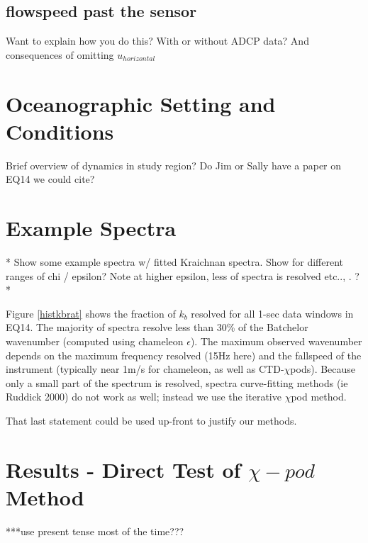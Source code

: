 \documentclass{ametsoc}
\begin{document}
\subsection{flowspeed past the sensor}

Want to explain how you do this?  With or without ADCP data?  And consequences of omitting $u_{horizontal}$


\section{Oceanographic Setting and Conditions}

Brief overview of dynamics in study region? Do Jim or Sally have a paper on EQ14 we could cite?


\section{Example Spectra}

* Show some example spectra w/ fitted Kraichnan spectra. Show for different ranges of chi / epsilon? Note at higher epsilon, less of spectra is resolved etc.., . ?*

Figure \ref{histkbrat} shows the fraction of $k_b$ resolved for all 1-sec data windows in EQ14. The majority of spectra resolve less than 30\% of the Batchelor wavenumber (computed using chameleon $\epsilon$). The maximum observed wavenumber depends on the maximum frequency resolved (15Hz here) and the fallspeed of the instrument (typically near 1m/s for chameleon, as well as CTD-$\chi$pods). Because only a small part of the spectrum is resolved, spectra curve-fitting methods (ie Ruddick 2000) do not work as well; instead we use the iterative $\chi$pod method.  

That last statement could be used up-front to justify our methods. 


\section{Results - Direct Test of $\chi -pod$ Method}

***use present tense most of the time???
\end{document}
